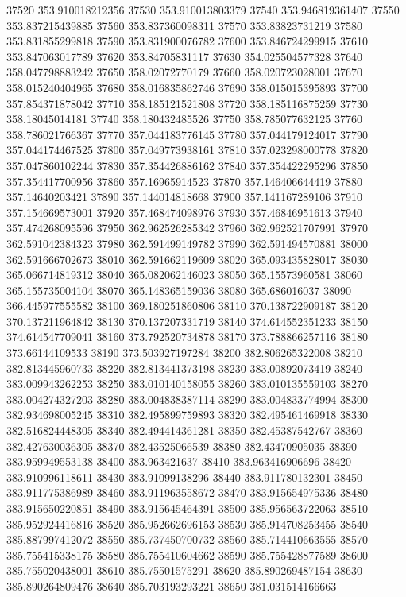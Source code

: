 {37520 353.910018212356
37530 353.910013803379
37540 353.946819361407
37550 353.837215439885
37560 353.837360098311
37570 353.83823731219
37580 353.831855299818
37590 353.831900076782
37600 353.846724299915
37610 353.847063017789
37620 353.84705831117
37630 354.025504577328
37640 358.047798883242
37650 358.02072770179
37660 358.020723028001
37670 358.015240404965
37680 358.016835862746
37690 358.015015395893
37700 357.854371878042
37710 358.185121521808
37720 358.185116875259
37730 358.18045014181
37740 358.180432485526
37750 358.785077632125
37760 358.786021766367
37770 357.044183776145
37780 357.044179124017
37790 357.044174467525
37800 357.049773938161
37810 357.023298000778
37820 357.047860102244
37830 357.354426886162
37840 357.354422295296
37850 357.354417700956
37860 357.16965914523
37870 357.146406644419
37880 357.14640203421
37890 357.144014818668
37900 357.141167289106
37910 357.154669573001
37920 357.468474098976
37930 357.46846951613
37940 357.474268095596
37950 362.962526285342
37960 362.962521707991
37970 362.591042384323
37980 362.591499149782
37990 362.591494570881
38000 362.591666702673
38010 362.591662119609
38020 365.093435828017
38030 365.066714819312
38040 365.082062146023
38050 365.15573960581
38060 365.155735004104
38070 365.148365159036
38080 365.686016037
38090 366.445977555582
38100 369.180251860806
38110 370.138722909187
38120 370.137211964842
38130 370.137207331719
38140 374.614552351233
38150 374.614547709041
38160 373.792520734878
38170 373.788866257116
38180 373.66144109533
38190 373.503927197284
38200 382.806265322008
38210 382.813445960733
38220 382.813441373198
38230 383.00892073419
38240 383.009943262253
38250 383.010140158055
38260 383.010135559103
38270 383.004274327203
38280 383.004838387114
38290 383.004833774994
38300 382.934698005245
38310 382.495899759893
38320 382.495461469918
38330 382.516824448305
38340 382.494414361281
38350 382.45387542767
38360 382.427630036305
38370 382.43525066539
38380 382.43470905035
38390 383.959949553138
38400 383.963421637
38410 383.963416906696
38420 383.910996118611
38430 383.91099138296
38440 383.911780132301
38450 383.911775386989
38460 383.911963558672
38470 383.915654975336
38480 383.915650220851
38490 383.915645464391
38500 385.956563722063
38510 385.952924416816
38520 385.952662696153
38530 385.914708253455
38540 385.887997412072
38550 385.737450700732
38560 385.714410663555
38570 385.755415338175
38580 385.755410604662
38590 385.755428877589
38600 385.755020438001
38610 385.75501575291
38620 385.890269487154
38630 385.890264809476
38640 385.703193293221
38650 381.031514166663
}
